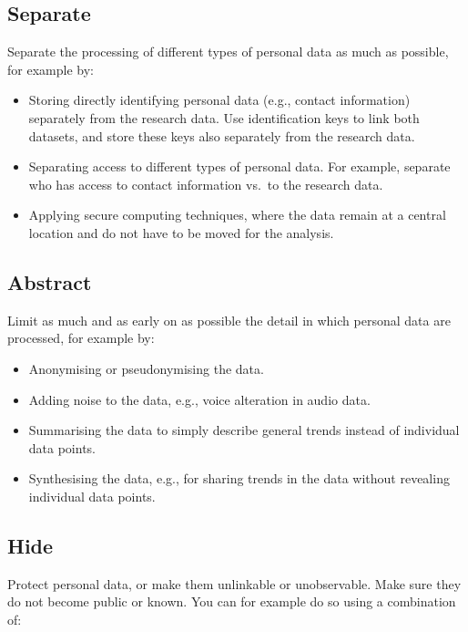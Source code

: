\documentclass[
]{book}
\providecommand{\tightlist}{%
  \setlength{\itemsep}{0pt}\setlength{\parskip}{0pt}}
\begin{document}
\hypertarget{separate}{%
\subsection{Separate}\label{separate}}

Separate the processing of different types of personal data as much as possible,
for example by:

\begin{itemize}
\tightlist
\item
  Storing directly identifying personal data (e.g., contact information)
  separately from the research data. Use identification keys to link both datasets,
  and store these keys also separately from the research data.
\item
  Separating access to different types of personal data. For example, separate
  who has access to contact information vs.~to the research data.
\item
  Applying secure computing techniques, where
  the data remain at a central location and do not have to be moved for the analysis.
\end{itemize}

\hypertarget{abstract}{%
\subsection{Abstract}\label{abstract}}

Limit as much and as early on as possible the detail in which personal data
are processed, for example by:

\begin{itemize}
\tightlist
\item
  Anonymising or pseudonymising
  the data.
\item
  Adding noise to the data, e.g., voice alteration in audio data.
\item
  Summarising the data to simply describe general trends instead of individual
  data points.
\item
  Synthesising the data, e.g., for sharing trends
  in the data without revealing individual data points.
\end{itemize}

\hypertarget{hide}{%
\subsection{Hide}\label{hide}}

Protect personal data, or make them unlinkable or unobservable. Make sure they
do not become public or known. You can for example do so using a combination of:
\end{document}
